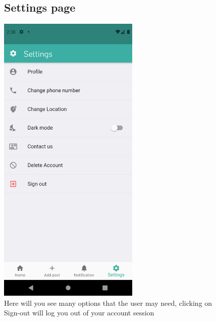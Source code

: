 \documentclass[12pt]{article}
\begin{document}
  \begin{figure}[h!]
\vspace{-2cm}
  \subsection*{Settings page}
\centerline{\includegraphics[width=0.6\textwidth]{./Screenshots/17.PNG}}
  \caption{Here will you see many options that the user may need, clicking on Sign-out will log you out of your account session}
  \end{figure}
\end{document}

